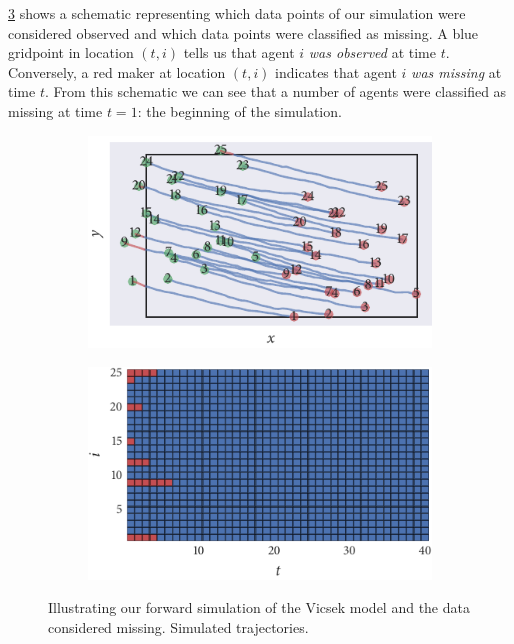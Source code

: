 \cref{subfig:beg_missing} shows a schematic representing which data points of
our simulation were considered observed and which data points were classified
as missing. A blue gridpoint in location $(t, i)$ tells us that agent $i$
\emph{was observed} at time $t$. Conversely, a red maker at location $(t, i)$
indicates that agent $i$ \emph{was missing} at time $t$. From this schematic we
can see that a number of agents were classified as missing at time $t=1$: the
beginning of the simulation.

\begin{figure}[tbp]
  \begin{subfigure}[b]{0.5\textwidth}
    \includegraphics{beg/data.pdf}
    \caption{}
    \label{subfig:beg_data}
  \end{subfigure}%
  \begin{subfigure}[b]{0.5\textwidth}
    \includegraphics{beg/missing_array.pdf}
    \caption{}
    \label{subfig:beg_missing}
  \end{subfigure}
  \caption{Illustrating our forward simulation of the Vicsek model and the
    data considered missing.  Simulated trajectories.
}
\end{figure}
